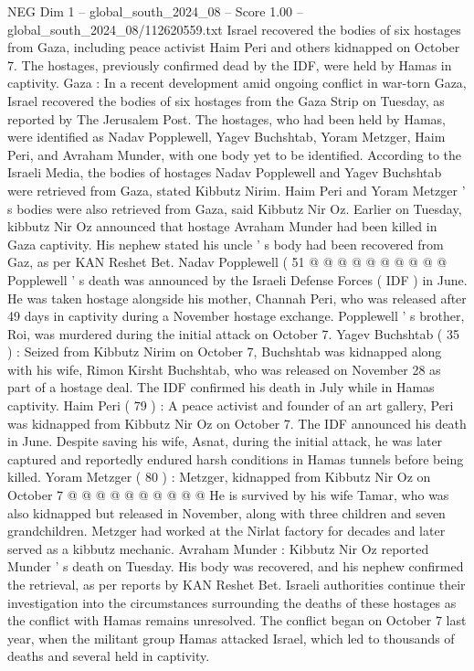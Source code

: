 \begin{textsample}{NEG Dim 1 – global\_south\_2024\_08 – Score 1.00 – global\_south\_2024\_08/112620559.txt}  \label{ex:f1_neg_125}
Israel recovered the bodies of six hostages from Gaza, including peace activist Haim Peri and others kidnapped on October 7.
The hostages, previously confirmed dead by the IDF, were held by Hamas in captivity.
Gaza : In a recent development amid ongoing conflict in war-torn Gaza, Israel recovered the bodies of six hostages from the Gaza Strip on Tuesday, as reported by The Jerusalem Post.
The hostages, who had been held by Hamas, were identified as Nadav Popplewell, Yagev Buchshtab, Yoram Metzger, Haim Peri, and Avraham Munder, with one body yet to be identified.
According to the Israeli Media, the bodies of hostages Nadav Popplewell and Yagev Buchshtab were retrieved from Gaza, stated Kibbutz Nirim.
Haim Peri and Yoram Metzger ' s bodies were also retrieved from Gaza, said Kibbutz Nir Oz.
Earlier on Tuesday, kibbutz Nir Oz announced that hostage Avraham Munder had been killed in Gaza captivity.
His nephew stated his uncle ' s body had been recovered from Gaz, as per KAN Reshet Bet.
Nadav Popplewell ( 51 @ @ @ @ @ @ @ @ @ @ Popplewell ' s death was announced by the Israeli Defense Forces ( IDF ) in June.
He was taken hostage alongside his mother, Channah Peri, who was released after 49 days in captivity during a November hostage exchange.
Popplewell ' s brother, Roi, was murdered during the initial attack on October 7.
Yagev Buchshtab ( 35 ) : Seized from Kibbutz Nirim on October 7, Buchshtab was kidnapped along with his wife, Rimon Kirsht Buchshtab, who was released on November 28 as part of a hostage deal.
The IDF confirmed his death in July while in Hamas captivity.
Haim Peri ( 79 ) : A peace activist and founder of an art gallery, Peri was kidnapped from Kibbutz Nir Oz on October 7.
The IDF announced his death in June.
Despite saving his wife, Asnat, during the initial attack, he was later captured and reportedly endured harsh conditions in Hamas tunnels before being killed.
Yoram Metzger ( 80 ) : Metzger, kidnapped from Kibbutz Nir Oz on October 7 @ @ @ @ @ @ @ @ @ @ He is survived by his wife Tamar, who was also kidnapped but released in November, along with three children and seven grandchildren.
Metzger had worked at the Nirlat factory for decades and later served as a kibbutz mechanic.
Avraham Munder : Kibbutz Nir Oz reported Munder ' s death on Tuesday.
His body was recovered, and his nephew confirmed the retrieval, as per reports by KAN Reshet Bet.
Israeli authorities continue their investigation into the circumstances surrounding the deaths of these hostages as the conflict with Hamas remains unresolved.
The conflict began on October 7 last year, when the militant group Hamas attacked Israel, which led to thousands of deaths and several held in captivity.

\end{textsample}
